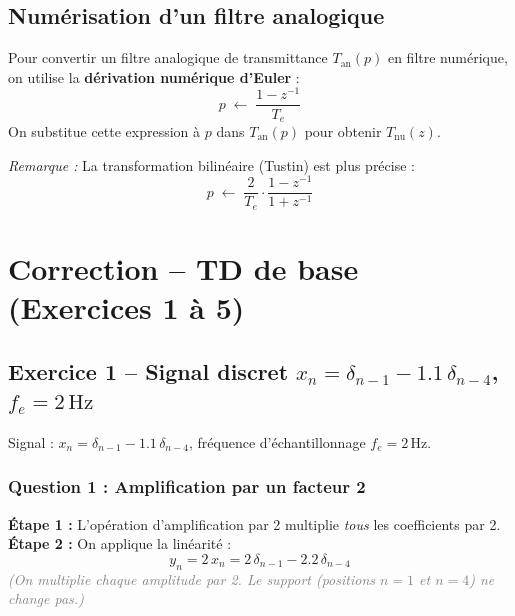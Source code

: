 \documentclass[12pt,a4paper]{article}
\newcommand{\step}[1]{\textcolor{coursbleu}{\textbf{Étape #1 :}}}
\newcommand{\explication}[1]{\textit{\textcolor{gray}{(#1)}}}
\begin{document}
\subsection{Numérisation d'un filtre analogique}

Pour convertir un filtre analogique de transmittance $T_{\text{an}}(p)$ en filtre numérique,
on utilise la \textbf{dérivation numérique d'Euler} :
\[
  p \;\longleftarrow\; \frac{1-z^{-1}}{T_e}
\]
On substitue cette expression à $p$ dans $T_{\text{an}}(p)$ pour obtenir $T_{\text{nu}}(z)$.

\textit{Remarque :} La transformation bilinéaire (Tustin) est plus précise :
\[
  p \;\longleftarrow\; \frac{2}{T_e}\cdot\frac{1-z^{-1}}{1+z^{-1}}
\]

\newpage
\section{Correction -- TD de base (Exercices 1 à 5)}

\subsection{Exercice 1 -- Signal discret
  \texorpdfstring{$x_n = \delta_{n-1} - 1.1\,\delta_{n-4}$, $f_e = 2\,\text{Hz}$}%
  {xn = delta(n-1) - 1.1 delta(n-4), fe = 2 Hz}}

\begin{tcolorbox}[coursbox, title=Énoncé]
Signal : $x_n = \delta_{n-1} - 1.1\,\delta_{n-4}$, fréquence d'échantillonnage $f_e = 2\,\text{Hz}$.
\end{tcolorbox}

\subsubsection*{Question 1 : Amplification par un facteur 2}

\begin{tcolorbox}[corrbox, title=Correction Q1]
\step{1} L'opération d'amplification par 2 multiplie \textit{tous} les coefficients par 2.\\[3pt]
\step{2} On applique la linéarité :
\[
  y_n = 2\,x_n = 2\,\delta_{n-1} - 2.2\,\delta_{n-4}
\]
\explication{On multiplie chaque amplitude par 2. Le support (positions $n=1$ et $n=4$) ne change pas.}
\end{tcolorbox}
\end{document}
